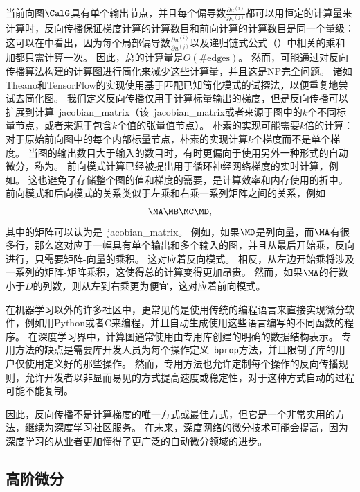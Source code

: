 当前向图$\CalG$具有单个输出节点，并且每个偏导数$\frac{\partial u^{(i)}}{\partial u^{(j)}}$都可以用恒定的计算量来计算时，反向传播保证梯度计算的计算数目和前向计算的计算数目是同一个量级：这可以在中看出，因为每个局部偏导数$\frac{\partial u^{(i)}}{\partial u^{(j)}}$以及递归链式公式（）中相关的乘和加都只需计算一次。
因此，总的计算量是$O(\#\text{edges})$。
然而，可能通过对反向传播算法构建的计算图进行简化来减少这些计算量，并且这是NP完全问题。
诸如Theano和TensorFlow的实现使用基于匹配已知简化模式的试探法，以便重复地尝试去简化图。
我们定义反向传播仅用于计算标量输出的梯度，但是反向传播可以扩展到计算~\gls{jacobian_matrix}（该~\gls{jacobian_matrix}或者来源于图中的$k$个不同标量节点，或者来源于包含$k$个值的张量值节点）。
朴素的实现可能需要$k$倍的计算：对于原始前向图中的每个内部标量节点，朴素的实现计算$k$个梯度而不是单个梯度。
当图的输出数目大于输入的数目时，有时更偏向于使用另外一种形式的自动微分，称为。
前向模式计算已经被提出用于循环神经网络梯度的实时计算，例如\citep{Williams-Zipser-1989}。
这也避免了存储整个图的值和梯度的需要，是计算效率和内存使用的折中。
前向模式和后向模式的关系类似于左乘和右乘一系列矩阵之间的关系，例如
\begin{equation}
  \MA \MB \MC \MD,
\end{equation}
其中的矩阵可以认为是~\gls{jacobian_matrix}。
例如，如果$\MD$是列向量，而$\MA$有很多行，那么这对应于一幅具有单个输出和多个输入的图，并且从最后开始乘，反向进行，只需要矩阵-向量的乘积。
这对应着反向模式。
相反，从左边开始乘将涉及一系列的矩阵-矩阵乘积，这使得总的计算变得更加昂贵。
然而，如果$\MA$的行数小于$D$的列数，则从左到右乘更为便宜，这对应着前向模式。

在机器学习以外的许多社区中，更常见的是使用传统的编程语言来直接实现微分软件，例如用Python或者C来编程，并且自动生成使用这些语言编写的不同函数的程序。
在深度学习界中，计算图通常使用由专用库创建的明确的数据结构表示。
专用方法的缺点是需要库开发人员为每个操作定义~\verb|bprop|方法，并且限制了库的用户仅使用定义好的那些操作。
然而，专用方法也允许定制每个操作的反向传播规则，允许开发者以非显而易见的方式提高速度或稳定性，对于这种方式自动的过程可能不能复制。

因此，反向传播不是计算梯度的唯一方式或最佳方式，但它是一个非常实用的方法，继续为深度学习社区服务。 
在未来，深度网络的微分技术可能会提高，因为深度学习的从业者更加懂得了更广泛的自动微分领域的进步。
  
  
\subsection{高阶微分}
\label{sec:higher_order_derivatives}

